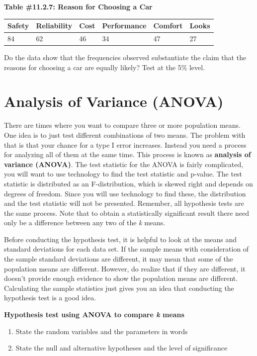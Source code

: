 \documentclass[]{book}
\begin{document}
\textbf{Table \#11.2.7: Reason for Choosing a Car}

\begin{longtable}[]{@{}llllll@{}}
\toprule
Safety & Reliability & Cost & Performance & Comfort & Looks\tabularnewline
\midrule
\endhead
84 & 62 & 46 & 34 & 47 & 27\tabularnewline
\bottomrule
\end{longtable}

Do the data show that the frequencies observed substantiate the claim that the reasons for choosing a car are equally likely? Test at the 5\% level.
\textbf{\\
}

\hypertarget{analysis-of-variance-anova}{%
\section{Analysis of Variance (ANOVA)}\label{analysis-of-variance-anova}}

There are times where you want to compare three or more population means. One idea is to just test different combinations of two means. The problem with that is that your chance for a type I error increases. Instead you need a process for analyzing all of them at the same time. This process is known as \textbf{analysis of variance (ANOVA)}. The test statistic for the ANOVA is fairly complicated, you will want to use technology to find the test statistic and p-value. The test statistic is distributed as an F-distribution, which is skewed right and depends on degrees of freedom. Since you will use technology to find these, the distribution and the test statistic will not be presented. Remember, all hypothesis tests are the same process. Note that to obtain a statistically significant result there need only be a difference between any two of the \emph{k} means.

Before conducting the hypothesis test, it is helpful to look at the means and standard deviations for each data set. If the sample means with consideration of the sample standard deviations are different, it may mean that some of the population means are different. However, do realize that if they are different, it doesn't provide enough evidence to show the population means are different. Calculating the sample statistics just gives you an idea that conducting the hypothesis test is a good idea.

\textbf{Hypothesis test using ANOVA to compare \emph{k} means}

\begin{enumerate}
\def\labelenumi{\arabic{enumi}.}
\item
  State the random variables and the parameters in words
\item
  State the null and alternative hypotheses and the level of significance
\end{enumerate}
\end{document}
